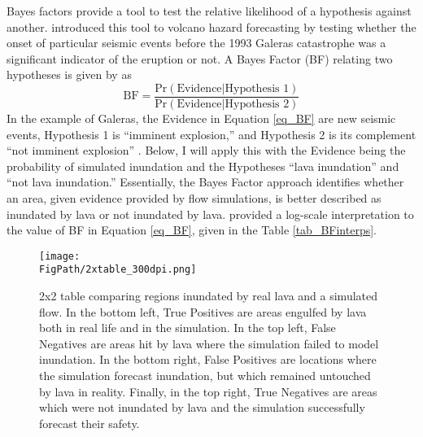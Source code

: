 	Bayes factors provide a tool to test the relative likelihood of a hypothesis against another. \citet{aspinall2003evidence} introduced this tool to volcano hazard forecasting by testing whether the onset of particular seismic events before the 1993 Galeras catastrophe was a significant indicator of the eruption or not. A Bayes Factor (BF) relating two hypotheses is given by \citet{jeffreys1998theory} as
	\begin{equation}
		\text{BF} = \frac{\text{Pr}(\text{Evidence}|\text{Hypothesis~1})}{\text{Pr}(\text{Evidence}|\text{Hypothesis~2})}
		\label{eq_BF}
	\end{equation}
	In the example of Galeras, the Evidence in Equation \ref{eq_BF} are new seismic events, Hypothesis 1 is ``imminent explosion,'' and Hypothesis 2 is its complement ``not imminent explosion'' \citep{aspinall2003evidence}. Below, I will apply this with the Evidence being the probability of simulated inundation and the Hypotheses ``lava inundation'' and ``not lava inundation.'' Essentially, the Bayes Factor approach identifies whether an area, given evidence provided by flow simulations, is better described as inundated by lava or not inundated by lava. \citet{jeffreys1998theory} provided a log-scale interpretation to the value of BF in Equation \ref{eq_BF}, given in the Table \ref{tab_BFinterps}.
	
	
	\begin{figure}
		\centering
		\texttt{[image: \\FigPath/2xtable\_300dpi.png]}
		\caption[2x2 table comparing regions inundated by real lava and a simulated flow]{2x2 table comparing regions inundated by real lava and a simulated flow. In the bottom left, True Positives are areas engulfed by lava both in real life and in the simulation. In the top left, False Negatives are areas hit by lava where the simulation failed to model inundation. In the bottom right, False Positives are locations where the simulation forecast inundation, but which remained untouched by lava in reality. Finally, in the top right, True Negatives are areas which were not inundated by lava and the simulation successfully forecast their safety.}
		\label{fig_2x2ch}
	\end{figure}
	
